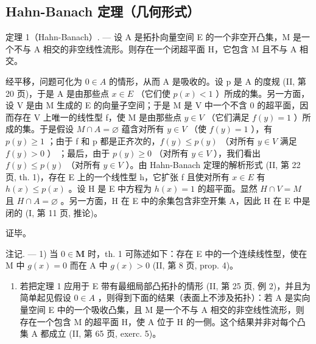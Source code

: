 \subsection{Hahn-Banach 定理（几何形式）}

定理 1（Hahn-Banach）. --- 设 A 是拓扑向量空间 E 的一个非空开凸集，M 是一个不与 A 相交的非空线性流形。则存在一个闭超平面 H，它包含 M 且不与 A 相交。

经平移，问题可化为 \(0 \in A\) 的情形，从而 A 是吸收的。设 p 是 A 的度规 (II, 第 20 页)，于是 A 是由那些点 \(x \in E\) （它们使 \(p(x) < 1\) ）所成的集。另一方面，设 V 是由 M 生成的 E 的向量子空间；于是 M 是 V 中一个不含 0 的超平面，因而存在 V 上唯一的线性型 f，使 M 是由那些点 \(y \in V\) （它们满足 \(f(y) = 1\) ）所成的集。于是假设 \(M \cap A = \varnothing\) 蕴含对所有 \(y \in V\) （使 \(f(y) = 1\) ），有 \(p(y) \geqslant 1\) ；由于 f 和 p 都是正齐次的，\(f(y) \leqslant p(y)\) （对所有 \(y \in V\) 满足 \(f(y) > 0\) ） ；最后，由于 \(p(y) \geqslant 0\) （对所有 \(y \in V\) ），我们看出 \(f(y) \leqslant p(y)\) （对所有 \(y \in V\) ）。由 Hahn-Banach 定理的解析形式 (II, 第 22 页, th. 1)，存在 E 上的一个线性型 h，它扩张 f 且使对所有 \(x \in E\) 有 \(h(x) \leqslant p(x)\) 。设 H 是 E 中方程为 \(h(x) = 1\) 的超平面。显然 \(H \cap V = M\) 且 \(H \cap A = \varnothing\) 。另一方面，H 在 E 中的余集包含非空开集 A，因此 H 在 E 中是闭的 (I, 第 11 页, 推论)。

证毕。

注记. --- 1) 当 \(0 \in \mathbf{M}\) 时，th. 1 可陈述如下：存在 E 中的一个连续线性型，使在 M 中 \(g(x) = 0\) 而在 A 中 \(g(x) > 0\) (II, 第 8 页, prop. 4)。

\begin{enumerate}
\def\labelenumi{\arabic{enumi})}
\setcounter{enumi}{1}
\tightlist
\item
  若把定理 1 应用于 E 带有最细局部凸拓扑的情形 (II, 第 25 页, 例 2)，并且为简单起见假设 \(0 \in A\) ，则得到下面的结果（表面上不涉及拓扑）：若 A 是实向量空间 E 中的一个吸收凸集，且 M 是一个不与 A 相交的非空线性流形，则存在一个包含 M 的超平面 H，使 A 位于 H 的一侧。这个结果并非对每个凸集 A 都成立 (II, 第 65 页, exerc. 5)。
\end{enumerate}

